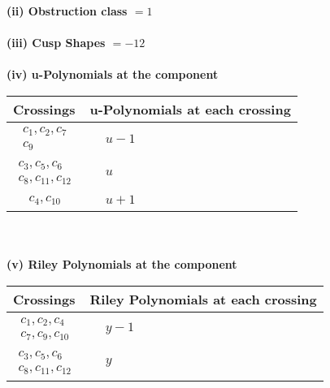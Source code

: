 \documentclass[1p]{elsarticle_modified}
\theoremstyle{definition}
\begin{document}
\flushleft \textbf{(ii) Obstruction class $= 1$}\\~\\
\flushleft \textbf{(iii) Cusp Shapes $= -12$}\\~\\
\newpage\renewcommand{\arraystretch}{1}
\flushleft \textbf{(iv) u-Polynomials at the component}\newline \\
\begin{tabular}{m{50pt}|m{274pt}}
Crossings & \hspace{64pt}u-Polynomials at each crossing \\
\hline $$\begin{aligned}c_{1},c_{2},c_{7}\\c_{9}\end{aligned}$$&$\begin{aligned}
&u-1
\end{aligned}$\\
\hline $$\begin{aligned}c_{3},c_{5},c_{6}\\c_{8},c_{11},c_{12}\end{aligned}$$&$\begin{aligned}
&u
\end{aligned}$\\
\hline $$\begin{aligned}c_{4},c_{10}\end{aligned}$$&$\begin{aligned}
&u+1
\end{aligned}$\\
\hline
\end{tabular}\\~\\
\newpage\renewcommand{\arraystretch}{1}
\flushleft \textbf{(v) Riley Polynomials at the component}\newline \\
\begin{tabular}{m{50pt}|m{274pt}}
Crossings & \hspace{64pt}Riley Polynomials at each crossing \\
\hline $$\begin{aligned}c_{1},c_{2},c_{4}\\c_{7},c_{9},c_{10}\end{aligned}$$&$\begin{aligned}
&y-1
\end{aligned}$\\
\hline $$\begin{aligned}c_{3},c_{5},c_{6}\\c_{8},c_{11},c_{12}\end{aligned}$$&$\begin{aligned}
&y
\end{aligned}$\\
\hline
\end{tabular}\\~\\
\end{document}
